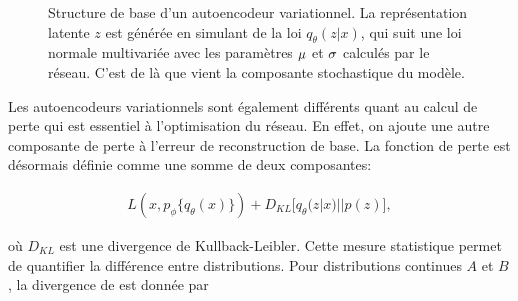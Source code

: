 \begin{figure}[h]
	\caption{Structure de base d'un autoencodeur variationnel. La représentation latente $z$ est générée en simulant de la loi $q_{\theta}(z|x)$,  qui suit une loi normale multivariée avec les paramètres $\boldmath \mu$ et $\boldmath \sigma$ calculés par le réseau. C'est de là que vient la composante stochastique du modèle.}
	\label{fig:VAEstructure}
\end{figure}

Les autoencodeurs variationnels sont également différents quant au calcul de perte qui est essentiel à l'optimisation du réseau. En effet, on ajoute une autre composante de perte à l'erreur de reconstruction de base. La fonction de perte est désormais définie comme une somme de deux composantes:

\begin{gather}  \label{eq:loss_vae}
L(x, p_\phi\{q_\theta(x)\}) + D_{KL}\big[q_\theta(z|x) || p(z)\big],
\end{gather}


où $D_{KL}$ est une divergence de Kullback-Leibler. Cette mesure statistique permet de quantifier la différence entre \DIFdelbegin {}\DIFdelend \DIFaddbegin {}\DIFaddend distributions. Pour \DIFdelbegin {}\DIFdelend \DIFaddbegin {}\DIFaddend distributions continues $A$ et $B$, la divergence de \DIFdelbegin {}\DIFdelend \DIFaddbegin {}\DIFaddend est donnée par
\DIFdelbegin \DIFdel{:
}\DIFdelend 


